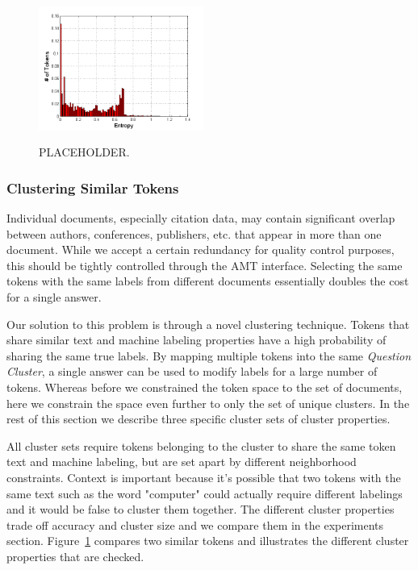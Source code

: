 \begin{figure}
		\includegraphics[width=0.48\textwidth]{images/red.png}
		\label{fig:cluster}
		\caption{PLACEHOLDER.} 
\end{figure}

\subsubsection{Clustering Similar Tokens}
Individual documents, especially citation data, may contain significant overlap between authors, conferences, publishers, etc. that appear in more than one document.  While we accept a certain redundancy for quality control purposes, this should be tightly controlled through the AMT interface.  Selecting the same tokens with the same labels from different documents essentially doubles the cost for a single answer.

Our solution to this problem is through a novel clustering technique.  Tokens that share similar text and machine labeling properties have a high probability of sharing the same true labels.  By mapping multiple tokens into the same \textit{Question Cluster}, a single answer can be used to modify labels for a large number of tokens.  Whereas before we constrained the token space to the set of documents, here we constrain the space even further to only the set of unique clusters.  In the rest of this section we describe three specific cluster sets of cluster properties.

All cluster sets require tokens belonging to the cluster to share the same token text and machine labeling, but are set apart by different neighborhood constraints.  Context is important because it's possible that two tokens with the same text such as the word "computer" could actually require different labelings and it would be false to cluster them together.  The different cluster properties trade off accuracy and cluster size and we compare them in the experiments section.  Figure~\ref{fig:cluster} compares two similar tokens and illustrates the different cluster properties that are checked.

